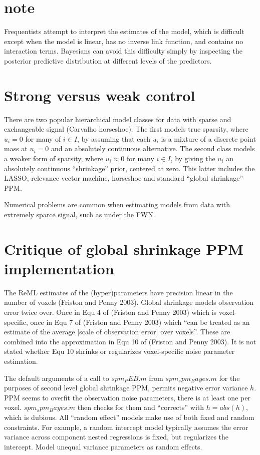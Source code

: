 \documentclass{article}
\begin{document}
\section{note}

Frequentists attempt to interpret the estimates of the model, which is difficult except when the model is linear, has no inverse link function, and contains no interaction terms. Bayesians can avoid this difficulty simply by inspecting the posterior predictive distribution at different levels of the predictors.

\section{Strong versus weak control}

There are two popular hierarchical model classes for data with sparse and exchangeable signal (Carvalho horseshoe). The first models true sparsity, where $u_i=0$ for many of $i \in I$, by assuming that each $u_i$ is a mixture of a discrete point mass at $u_i=0$ and an absolutely continuous alternative. The second class models a weaker form of sparsity, where $u_i \approx 0$ for many $i \in I$, by giving the $u_i$ an absolutely continuous ``shrinkage'' prior, centered at zero. This latter includes the LASSO, relevance vector machine, horseshoe and standard ``global shrinkage'' PPM.

Numerical problems are common when estimating models from data with extremely sparce signal, such as under the FWN.

\section{Critique of global shrinkage PPM implementation}
The ReML estimates of the (hyper)parameters have precision linear in the number of voxels (Friston and Penny 2003).
Global shrinkage models observation error twice over. Once in Equ 4 of (Friston and Penny 2003) which is voxel-specific, once in Equ 7  of (Friston and Penny 2003) which ``can be treated as an estimate of the average [scale of observation error] over voxels''. These are combined into the approximation in Equ 10 of (Friston and Penny 2003). It is not stated whether Equ 10 shrinks or regularizes voxel-specific noise parameter estimation. 

The default arguments of a call to $spm_PEB.m$ from $spm_spm_Bayes.m$ for the purposes of second level global shrinkage PPM, permits negative error variance $h$.
PPM seems to overfit the observation noise parameters, there is at least one per voxel.
$spm_spm_Bayes.m$ then checks for them and ``corrects'' with $h = abs(h)$, which is dubious.
All ``random effect'' models make use of both fixed and random constraints. For example, a random intercept model typically assumes the error variance across component nested regressions is fixed, but regularizes the intercept. Model unequal variance parameters as random effects.
\end{document}
